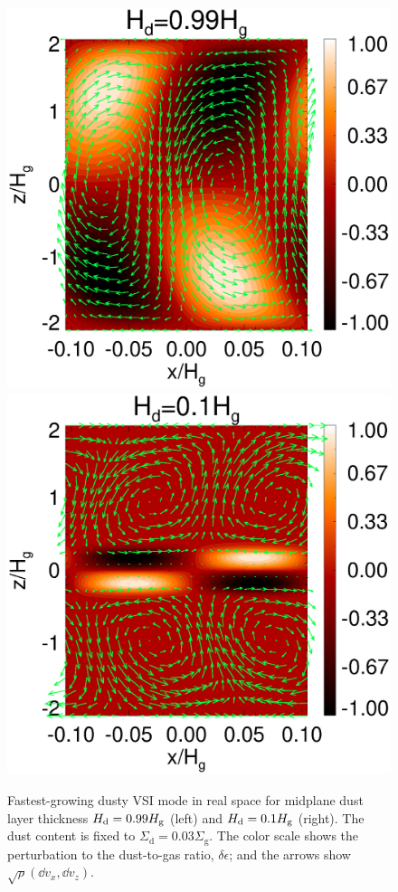 \begin{figure}
  \includegraphics[scale=0.32, clip=true, trim=0.5cm 0cm 3cm 0cm]{figures/result2d_Hd1.ps}\includegraphics[scale=0.32, clip=true, trim=1.8cm 0cm 0cm 0cm]{figures/result2d_Hd0d1.ps} 
  \caption{Fastest-growing dusty VSI mode in real space for midplane
    dust layer thickness $H_\mathrm{d}=0.99H_\mathrm{g}$ (left) and $H_\mathrm{d}=0.1H_\mathrm{g}$
    (right). The dust content is fixed to
    $\Sigma_\mathrm{d}=0.03\Sigma_\mathrm{g}$. 
    The color scale shows the perturbation to the
    dust-to-gas ratio, $\delta\epsilon$; and the arrows show
    $\sqrt{\rho}\left(\dd v_x, \dd v_z\right)$.
    \label{result2d_fixZ}
    }
\end{figure}

